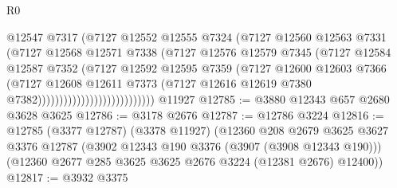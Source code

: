 \begin{lexlean}{R0}
\begin{coremodule}
                                        @12547
                                        @7317
                                        (@7127
                                          @12552
                                          @12555
                                          @7324
                                          (@7127
                                            @12560
                                            @12563
                                            @7331
                                            (@7127
                                              @12568
                                              @12571
                                              @7338
                                              (@7127
                                                @12576
                                                @12579
                                                @7345
                                                (@7127
                                                  @12584
                                                  @12587
                                                  @7352
                                                  (@7127
                                                    @12592
                                                    @12595
                                                    @7359
                                                    (@7127
                                                      @12600
                                                      @12603
                                                      @7366
                                                      (@7127
                                                        @12608
                                                        @12611
                                                        @7373
                                                        (@7127
                                                          @12616
                                                          @12619
                                                          @7380
                                                          @7382)))))))))))))))))))))))))))
    @11927
@12785 := @3880 @12343 @657 @2680 @3628 @3625
@12786 := @3178 @2676
@12787 := @12786 @3224
@12816 := @12785
    (@3377 @12787)
    (@3378 @11927)
    (@12360
      @208
      @2679
      @3625
      @3627
      @3376
      @12787
      (@3902 @12343 @190 @3376 (@3907 (@3908 @12343 @190)))
      (@12360 @2677 @285 @3625 @3625 @2676 @3224 (@12381 @2676) @12400))
@12817 := @3932 @3375

\end{coremodule}
\end{lexlean}
